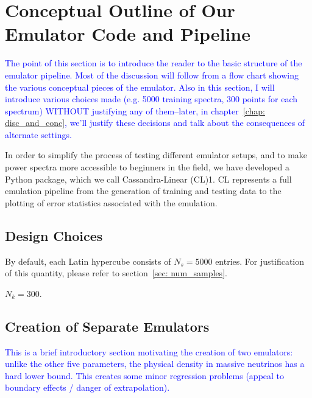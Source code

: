 \chapter{Conceptual Outline of Our Emulator Code and Pipeline}

\textcolor{blue}{The point of this section is to introduce the reader to the
basic structure of the emulator pipeline. Most of the discussion will follow
from a flow chart showing the various conceptual pieces of the emulator. Also
in this section, I will introduce various choices made (e.g. 5000 training
spectra, 300 points for each spectrum) WITHOUT justifying any of them--later,
in chapter~\ref{chap: disc_and_conc}, we'll justify these decisions and
talk about the consequences of alternate settings.}

In order to simplify the process of testing different emulator setups, and to make power
spectra more accessible to beginners in the field, we have developed a Python package,
which we call Cassandra-Linear (CL)1. CL represents a full emulation pipeline from the
generation of training and testing data to the plotting of error statistics associated with
the emulation.


\section{Design Choices}

By default, each Latin hypercube consists of $N_s = 5000$ entries. For 
justification of this quantity, please refer to
section~\ref{sec: num_samples}.

$N_k = 300$.

\section{Creation of Separate Emulators}
\label{sec: 2emu_intro}

\textcolor{blue}{This is a brief introductory section motivating the creation 
of two emulators:
unlike the other five parameters, the physical density in massive neutrinos 
has a hard lower bound. This creates some minor regression problems (appeal to 
boundary effects / danger of extrapolation).}

